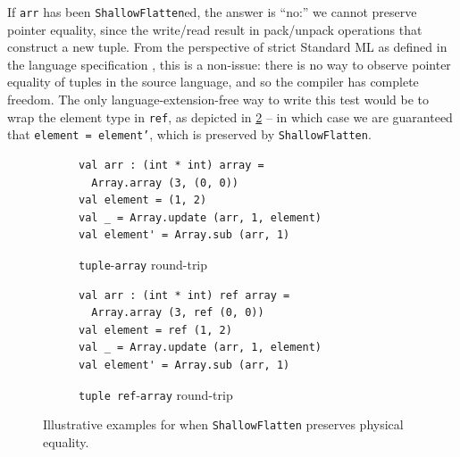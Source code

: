 If \texttt{arr} has been \texttt{ShallowFlatten}ed, the answer is ``no:'' we
cannot preserve pointer equality, since the write/read result in pack/unpack
operations that construct a new tuple. From the perspective of strict Standard ML
as defined in the language specification \citep{sml-def}, this is a non-issue:
there is no way to observe pointer equality of tuples in the source language,
and so the compiler has complete freedom. The only language-extension-free way
to write this test would be to wrap the element type in \texttt{ref}, as
depicted in \cref{fig:push_pop_ref} -- in which case we are guaranteed
that \texttt{element = element'}, which is preserved by \texttt{ShallowFlatten}.

\begin{figure}[htbp]
  \centering
  \begin{subfigure}[t]{0.48\textwidth}
    \caption{\texttt{tuple}-\texttt{array} round-trip}
    \label{fig:push_pop}
    \vspace{1mm}
\begin{verbatim}
val arr : (int * int) array =
  Array.array (3, (0, 0))
val element = (1, 2)
val _ = Array.update (arr, 1, element)
val element' = Array.sub (arr, 1)
\end{verbatim}
  \end{subfigure}\hfill
  \begin{subfigure}[t]{0.48\textwidth}
    \caption{\texttt{tuple ref}-\texttt{array} round-trip}
    \label{fig:push_pop_ref}
    \vspace{1mm}
\begin{verbatim}
val arr : (int * int) ref array =
  Array.array (3, ref (0, 0))
val element = ref (1, 2)
val _ = Array.update (arr, 1, element)
val element' = Array.sub (arr, 1)
\end{verbatim}
  \end{subfigure}
  \caption{Illustrative examples for when \texttt{ShallowFlatten} preserves
  physical equality.}
  \label{fig:push_pop_comparison}
\end{figure}

